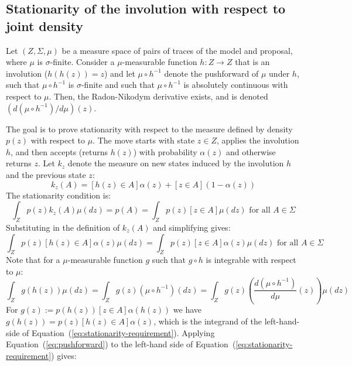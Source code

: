 \documentclass[twoside]{article}
\begin{document}
\subsection{Stationarity of the involution with respect to joint density}
Let $(Z, \Sigma, \mu)$ be a measure space of pairs of traces of the model and proposal, where $\mu$ is $\sigma$-finite.
Consider a $\mu$-measurable function $h : Z \to Z$ that is an involution ($h(h(z)) = z$) and let $\mu \circ h^{-1}$ denote the pushforward of $\mu$ under $h$, such that $\mu \circ h^{-1}$ is $\sigma$-finite and such that $\mu \circ h^{-1}$ is absolutely continuous with respect to $\mu$.
Then, the Radon-Nikodym derivative exists, and is denoted $(d (\mu \circ h^{-1}) / d \mu)(z)$.

The goal is to prove stationarity with respect to the measure defined by density $p(z)$ with respect to $\mu$.
The move starts with state $z \in Z$, applies the involution $h$, and then accepts (returns $h(z)$) with probability $\alpha(z)$ and otherwise returns $z$.
Let $k_{z}$ denote the measure on new states induced by the involution $h$ and the previous state $z$:
\begin{equation}
k_{z}(A) = [h(z) \in A] \alpha(z) + [z \in A] (1 - \alpha(z))
\end{equation}
The stationarity condition is:
\begin{equation}
\int_Z p(z) k_{z}(A) \mu(dz) = p(A) = \int_Z p(z) [z \in A] \mu(dz) \mbox{ for all } A \in \Sigma
\end{equation}
Substituting in the definition of $k_z(A)$ and simplifying gives:
\begin{equation} \label{eq:stationarity-requirement}
\int_Z p(z) [h(z) \in A] \alpha(z) \mu(dz) = \int_Z p(z) [z \in A] \alpha(z) \mu(dz) \mbox{ for all } A \in \Sigma
\end{equation}
Note that for a $\mu$-measurable function $g$ such that $g \circ h$ is integrable with respect to $\mu$:
\begin{equation} \label{eq:pushforward}
\int_Z g(h(z)) \mu(dz) = \int_Z g(z) (\mu \circ h^{-1})(dz) = \int_Z g(z) \left( \frac{d (\mu \circ h^{-1})}{d \mu}(z) \right) \mu(dz)
\end{equation}
For $g(z) := p(h(z)) [z \in A] \alpha(h(z))$ we have $g(h(z)) = p(z) [h(z) \in A] \alpha(z)$, which is the integrand of the left-hand-side of Equation~(\ref{eq:stationarity-requirement}).
Applying Equation~(\ref{eq:pushforward}) to the left-hand side of Equation~(\ref{eq:stationarity-requirement}) gives:
\end{document}
